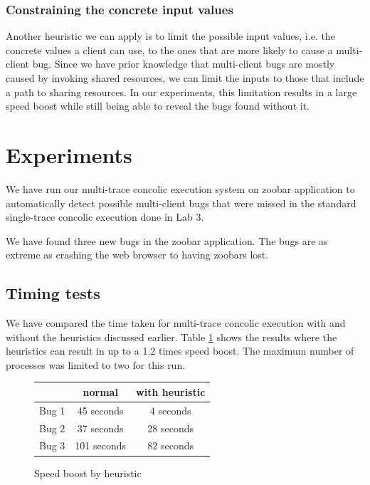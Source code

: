 \documentclass{llncs}
\begin{document}
\subsubsection{Constraining the concrete input values}

Another heuristic we can apply is to limit the possible input values,
i.e. the concrete values a client can use, to the ones that are more
likely to cause a multi-client bug. Since we have prior knowledge that
multi-client bugs are mostly caused by invoking shared resources, we
can limit the inputs to those that include a path to sharing
resources. In our experiments, this limitation results in a large
speed boost while still being able to reveal the bugs found without
it.

\section{Experiments}

We have run our multi-trace concolic execution system on zoobar
application to automatically detect possible multi-client bugs that
were missed in the standard single-trace concolic execution done in
Lab 3.

We have found three new bugs in the zoobar application. The bugs are
as extreme as crashing the web browser to having zoobars lost.

\subsection{Timing tests}

We have compared the time taken for multi-trace concolic execution
with and without the heuristics discussed earlier. Table
\ref{fig:speed} shows the results where the heuristics can result in
up to a 1.2 times speed boost. The maximum number of processes was
limited to two for this run.

\begin{figure}
  \begin{center}
    \begin{tabular}{l|c|c}
      \hline
      & normal & with heuristic \\
      \hline
      Bug 1 & 45 seconds & 4 seconds \\
      Bug 2 & 37 seconds & 28 seconds \\
      Bug 3 & 101 seconds & 82 seconds \\
      \hline
    \end{tabular}
  \end{center}
  \caption{Speed boost by heuristic}
  \label{fig:speed}
\end{figure}
\end{document}
